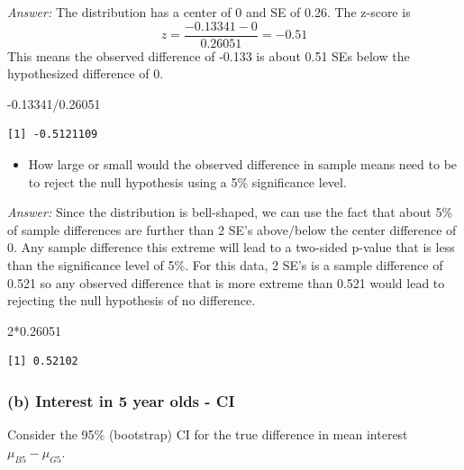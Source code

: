 \documentclass[
]{book}
\newenvironment{Shaded}{\begin{snugshade}}{\end{snugshade}}
\newcommand{\DecValTok}[1]{\textcolor[rgb]{0.00,0.00,0.81}{#1}}
\newcommand{\FloatTok}[1]{\textcolor[rgb]{0.00,0.00,0.81}{#1}}
\newcommand{\SpecialCharTok}[1]{\textcolor[rgb]{0.00,0.00,0.00}{#1}}
\providecommand{\tightlist}{%
  \setlength{\itemsep}{0pt}\setlength{\parskip}{0pt}}
\begin{document}
\emph{Answer:} The distribution has a center of 0 and SE of 0.26. The z-score is
\[
z = \dfrac{-0.13341 - 0}{0.26051} = -0.51
\]
This means the observed difference of -0.133 is about 0.51 SEs below the hypothesized difference of 0.

\begin{Shaded}
\begin{Highlighting}[]
\SpecialCharTok{{-}}\FloatTok{0.13341}\SpecialCharTok{/}\FloatTok{0.26051} 
\end{Highlighting}
\end{Shaded}

\begin{verbatim}
[1] -0.5121109
\end{verbatim}

\begin{itemize}
\tightlist
\item
  How large or small would the observed difference in sample means need to be to reject the null hypothesis using a 5\% significance level.
\end{itemize}

\emph{Answer:} Since the distribution is bell-shaped, we can use the fact that about 5\% of sample differences are further than 2 SE's above/below the center difference of 0. Any sample difference this extreme will lead to a two-sided p-value that is less than the significance level of 5\%. For this data, 2 SE's is a sample difference of 0.521 so any observed difference that is more extreme than 0.521 would lead to rejecting the null hypothesis of no difference.

\begin{Shaded}
\begin{Highlighting}[]
\DecValTok{2}\SpecialCharTok{*}\FloatTok{0.26051} 
\end{Highlighting}
\end{Shaded}

\begin{verbatim}
[1] 0.52102
\end{verbatim}

\vspace*{.5in}

\hypertarget{b-interest-in-5-year-olds---ci}{%
\subsubsection{(b) Interest in 5 year olds - CI}\label{b-interest-in-5-year-olds---ci}}

Consider the 95\% (bootstrap) CI for the true difference in mean interest \(\mu_{B5} - \mu_{G5}\).
\end{document}
